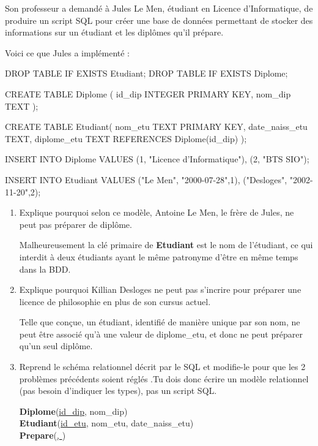\documentclass[a4paper,12pt]{article}
\begin{document}
Son professeur a demandé à Jules Le Men, étudiant en Licence d'Informatique, de produire un script SQL pour créer une base de données permettant de
stocker des informations sur un étudiant et les diplômes qu'il prépare.

Voici ce que Jules a implémenté :

\begin{sql}
DROP TABLE IF EXISTS Etudiant;
DROP TABLE IF EXISTS Diplome;

CREATE TABLE Diplome
(
    id_dip INTEGER PRIMARY KEY,
    nom_dip TEXT
);

CREATE TABLE Etudiant(
    nom_etu TEXT PRIMARY KEY,
    date_naiss_etu TEXT,
    diplome_etu TEXT REFERENCES Diplome(id_dip)
);

INSERT INTO Diplome VALUES
    (1, "Licence d'Informatique"),
    (2, "BTS SIO");

INSERT INTO Etudiant VALUES
    ("Le Men", "2000-07-28",1),
    ("Desloges", "2002-11-20",2);
\end{sql}


\begin{enumerate}[\bfseries 1.]
	\item 	Explique pourquoi selon ce modèle, Antoine Le Men, le frère de Jules, ne peut pas préparer de diplôme.
    \begin{encadre}[Réponse]
    Malheureusement la clé primaire de \textbf{Etudiant} est le nom de l'étudiant, ce qui interdit à deux étudiants ayant le même patronyme d'être en même temps dans la BDD.
    \end{encadre}
	\item 	Explique pourquoi Killian Desloges ne peut pas s'incrire pour préparer une licence de philosophie en plus de son cursus actuel.\\
    \begin{encadre}[Réponse]
    Telle que conçue, un étudiant, identifié de manière unique par son nom, ne peut être associé qu'à une valeur de diplome\_etu, et donc ne peut préparer qu'un seul diplôme.
    \end{encadre}
    \item   Reprend le schéma relationnel décrit par le SQL et modifie-le pour que les 2 problèmes précédents soient réglés .Tu dois donc écrire un modèle relationnel (pas besoin d'indiquer les types), pas un script SQL.\\
        \begin{encadre}[Réponse]
        \textbf{Diplome}(\uline{id\_dip}, nom\_dip)\\

        \textbf{Etudiant}(\uline{id\_etu}, nom\_etu, date\_naiss\_etu)\\

        \textbf{Prepare}(\uline{, })

        \end{encadre}


\end{enumerate}
\end{document}
